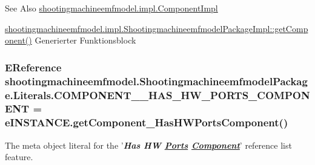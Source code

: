 \begin{DoxySeeAlso}{See Also}
\hyperlink{classshootingmachineemfmodel_1_1impl_1_1_component_impl}{shootingmachineemfmodel.\-impl.\-Component\-Impl} 

\hyperlink{classshootingmachineemfmodel_1_1impl_1_1_shootingmachineemfmodel_package_impl_a375240560ab7b64152ec7b4e53a51ee3}{shootingmachineemfmodel.\-impl.\-Shootingmachineemfmodel\-Package\-Impl\-::get\-Component()} Generierter Funktionsblock 
\end{DoxySeeAlso}
\hypertarget{interfaceshootingmachineemfmodel_1_1_shootingmachineemfmodel_package_1_1_literals_af00875b2bf09abb0623ee37ecc1eadcb}{
\subsubsection[{C\-O\-M\-P\-O\-N\-E\-N\-T\-\_\-\-\_\-\-H\-A\-S\-\_\-\-H\-W\-\_\-\-P\-O\-R\-T\-S\-\_\-\-C\-O\-M\-P\-O\-N\-E\-N\-T}]{\setlength{\rightskip}{0pt plus 5cm}E\-Reference shootingmachineemfmodel.\-Shootingmachineemfmodel\-Package.\-Literals.\-C\-O\-M\-P\-O\-N\-E\-N\-T\-\_\-\-\_\-\-H\-A\-S\-\_\-\-H\-W\-\_\-\-P\-O\-R\-T\-S\-\_\-\-C\-O\-M\-P\-O\-N\-E\-N\-T = e\-I\-N\-S\-T\-A\-N\-C\-E.\-get\-Component\-\_\-\-Has\-H\-W\-Ports\-Component()}}\label{interfaceshootingmachineemfmodel_1_1_shootingmachineemfmodel_package_1_1_literals_af00875b2bf09abb0623ee37ecc1eadcb}
The meta object literal for the '{\itshape {\bfseries Has H\-W \hyperlink{interfaceshootingmachineemfmodel_1_1_ports}{Ports} \hyperlink{interfaceshootingmachineemfmodel_1_1_component}{Component}}}' reference list feature.

